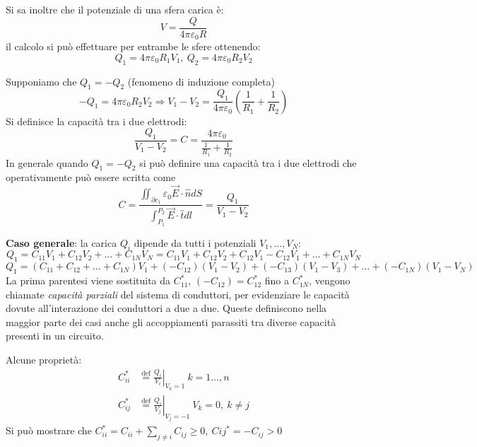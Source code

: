 Si sa inoltre che il potenziale di una sfera carica è:
$$
V = \frac{Q}{4 \pi \varepsilon_0 R}
$$
il calcolo si può effettuare per entrambe le sfere ottenendo:
$$
Q_1 = 4 \pi \varepsilon_0 R_1 V_1,\ Q_2 = 4 \pi \varepsilon_0 R_2 V_2
$$

Supponiamo che $Q_1 = -Q_2$ (fenomeno di induzione completa)
$$
-Q_1 = 4 \pi \varepsilon_0 R_2 V_2 \Rightarrow V_1 - V_2 = \frac{Q_1}{4 \pi \varepsilon_0}
\left(\frac{1}{R_1} + \frac{1}{R_2}\right)
$$
Si definisce la capacità tra i due elettrodi:
$$
\frac{Q_1}{V_1 - V_2} = C = \frac{4 \pi \varepsilon_0}{\frac{1}{R_1}+\frac{1}{R_2}}
$$
In generale quando $Q_1 = - Q_2$ si può definire una capacità tra i due elettrodi che operativamente
può essere scritta come 
$$
C = \frac{\iint_{\partial c_1} \varepsilon_0 \vec{E}\cdot\hat{n}dS} {\int_{P_1}^{P_2}\vec{E}\cdot\hat{t} dl} = \frac{Q_1}{V_1 - V_2}
$$


\textbf{Caso generale}: la carica $Q_i$ dipende da tutti i potenziali $V_1, \ldots ,V_N$:
$$
Q_1 = C_{11}V_1 + C_{12}V_2 + \ldots + C_{1N}V_N = C_{11}V_1 + C_{12}V_2 + C_{12}V_1 - C_{12} V_1 +
\ldots  + C_{1N}V_N
$$
$$
Q_1 = \left(C_{11}+C_{12} + \ldots + C_{1N}\right) V_1 + (-C_{12})(V_1-V_2) + (-C_{13})(V_1-V_3)
+ \ldots + (-C_{1N})(V_1-V_N)
$$
La prima parentesi viene sostituita da $C_{11}^*$, $(-C_{12}) = C_{12}^*$ fino a $C_{1N}^*$,
vengono chiamate
\textit{capacità parziali} del sistema di conduttori, per evidenziare le capacità 
dovute all'interazione dei conduttori a due a due.
Queste definiscono nella maggior parte dei casi anche gli accoppiamenti parassiti
tra diverse capacità presenti in un circuito.

Alcune proprietà:
$$\begin{aligned}
C_{ii}^* &\stackrel{\text{def}}{=} \left.\frac{Q_i}{V_i}\right|_{V_k = 1}\ k=1\ldots ,n\\
C_{ij}^* &\stackrel{\text{def}}{=} \left.\frac{Q_i}{V_j}\right|_{V_j=-1}\ V_k = 0,\ k \neq j
\end{aligned}
$$
Si può mostrare che $C_{ii}^* =C_{ii} + \sum_{j\neq i}C_{ij} \geq 0,\ C{ij}^* = -C_{ij} > 0$

